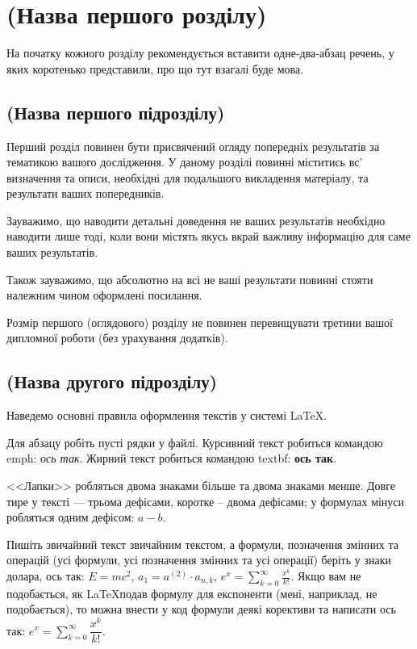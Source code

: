 
\chapter{(Назва першого розділу)}
\label{chap:review}  %

На початку кожного розділу рекомендується вставити одне-два-абзац речень, 
у яких коротенько представили, про що тут взагалі буде мова.

\section{(Назва першого підрозділу)}

Перший розділ повинен бути присвячений огляду попередніх результатів за 
тематикою вашого дослідження. У даному розділі повинні міститись вс' 
визначення та описи, необхідні для подальшого викладення матеріалу, та результати 
ваших попередників.

Зауважимо, що наводити детальні доведення не ваших результатів необхідно 
наводити лише тоді, коли вони містять якусь вкрай важливу інформацію для 
саме ваших результатів.

Також зауважимо, що абсолютно на всі не ваші результати повинні стояти 
належним чином оформлені посилання.

Розмір першого (оглядового) розділу не повинен перевищувати третини вашої 
дипломної роботи (без урахування додатків).


\section{(Назва другого підрозділу)}

Наведемо основні правила оформлення текстів у системі \LaTeX.

Для абзацу робіть пусті рядки у файлі. Курсивний текст робиться командою 
emph: \emph{ось так}. Жирний текст робиться командою textbf: \textbf{ось так}.

<<Лапки>> робляться двома знаками більше та двома знаками менше. Довге 
тире у тексті --- трьома дефісами, коротке -- двома дефісами; у формулах 
мінуси робляться одним дефісом: $a-b$.

Пишіть звичайний текст звичайним текстом, а формули, позначення змінних та 
операцій (усі формули, усі позначення змінних та усі операції) беріть у 
знаки долара, ось так: $E = mc^2$, $a_1 = a^{(2)} \cdot a_{n, k}$, $e^x = 
\sum_{k = 0}^{\infty} {\frac{x^k}{k!}}$. Якщо вам 
не подобається, як \LaTeX подав формулу для експоненти (мені, наприклад, 
не подобається), то можна внести у код формули деякі корективи та написати ось так: $e^x 
= \sum\limits_{k = 0}^{\infty} {\dfrac{x^k}{k!}}$.

